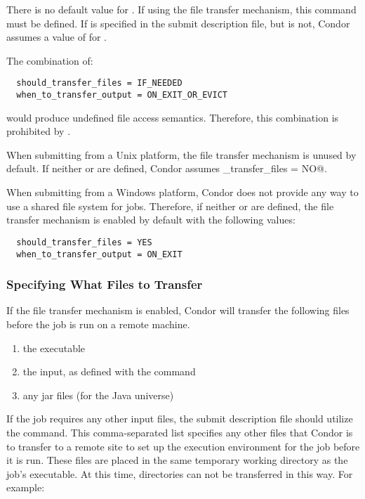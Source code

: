There is no default value for .
If using the file transfer mechanism, 
this command must be defined.
If  is specified in the submit
description file,
but  is not, Condor assumes a
value of \verb@YES@ for .

\Note The combination of:
\begin{verbatim}
  should_transfer_files = IF_NEEDED
  when_to_transfer_output = ON_EXIT_OR_EVICT
\end{verbatim}
would produce undefined file access semantics.
Therefore, this combination is prohibited by .

When submitting from a Unix platform,
the file transfer mechanism is unused by default.
If neither  or  
are defined, Condor assumes
\verb@should_transfer_files = NO@.

When submitting from a Windows platform,
Condor does not provide any way to use a shared file
system for jobs. 
Therefore, if 
neither  or 
are defined, the file
transfer mechanism is enabled by default with the following values:

\begin{verbatim}
  should_transfer_files = YES
  when_to_transfer_output = ON_EXIT
\end{verbatim}


\subsubsection{Specifying What Files to Transfer}

If the file transfer mechanism is enabled,
Condor will transfer the following files before the job
is run on a remote machine.
\begin{enumerate}
  \item the executable
  \item the input, as defined with the  command
  \item any jar files (for the Java universe)
\end{enumerate}
If the job requires any other input files,
the submit description file should utilize the
 command.
This comma-separated list specifies any other files that Condor is to
transfer to a remote site to set up the execution environment for the
job before it is run.
These files are placed in the same temporary working directory
as the job's executable.
At this time, directories can not be transferred in this way.
For example:

